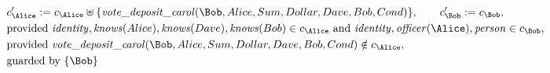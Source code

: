 \begin{align*}
&
c'_
{
\Alice
}
 := 
c_
{
\Alice
}
 \uplus 
\{
\mathit{\detokenize{
vote_deposit_carol
}}
(
\Bob
,
Alice
,
Sum
,
Dollar
,
Dave
,
Bob
,
Cond
)
\}
, \qquad 
c'_
{
\Bob
}
 := 
c_
{
\Bob
}
,\\
&
\text{provided } 
\mathit{\detokenize{
identity
}}
,
\mathit{\detokenize{
knows
}}
(
Alice
)
,
\mathit{\detokenize{
knows
}}
(
Dave
)
,
\mathit{\detokenize{
knows
}}
(
Bob
)
 \in c_
{
\Alice
}
 \text{ and } 
\mathit{\detokenize{
identity
}}
,
\mathit{\detokenize{
officer
}}
(
\Alice
)
,
\mathit{\detokenize{
person
}}
 \in c_
{
\Bob
}
,\\
&
\text{provided } 
\mathit{\detokenize{
vote_deposit_carol
}}
(
\Bob
,
Alice
,
Sum
,
Dollar
,
Dave
,
Bob
,
Cond
)
 \notin c_
{
\Alice
}
,\\
&
\text{guarded by } \{
\Bob
\}
\end{align*}

